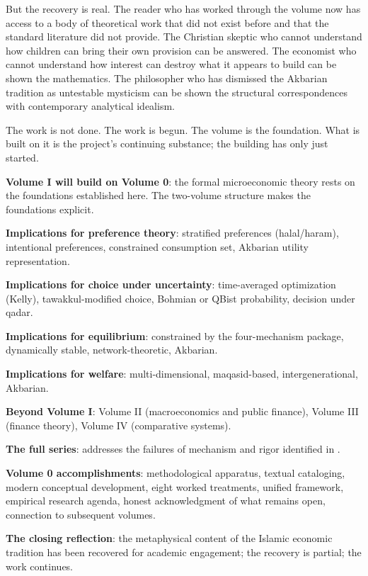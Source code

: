 But the recovery is real. The reader who has worked through the
volume now has access to a body of theoretical work that did not
exist before and that the standard literature did not provide.
The Christian skeptic who cannot understand how children can bring
their own provision can be answered. The economist who cannot
understand how interest can destroy what it appears to build can
be shown the mathematics. The philosopher who has dismissed the
Akbarian tradition as untestable mysticism can be shown the
structural correspondences with contemporary analytical idealism.

The work is not done. The work is begun. The volume is the
foundation. What is built on it is the project's continuing
substance; the building has only just started.

\begin{summarybox}
\textbf{Volume I will build on Volume 0}: the formal microeconomic
theory rests on the foundations established here. The two-volume
structure makes the foundations explicit.

\textbf{Implications for preference theory}: stratified
preferences (halal/haram), intentional preferences,
constrained consumption set, Akbarian utility representation.

\textbf{Implications for choice under uncertainty}: time-averaged
optimization (Kelly), tawakkul-modified choice, Bohmian or QBist
probability, decision under qadar.

\textbf{Implications for equilibrium}: constrained by the
four-mechanism package, dynamically stable, network-theoretic,
Akbarian.

\textbf{Implications for welfare}: multi-dimensional, maqasid-based,
intergenerational, Akbarian.

\textbf{Beyond Volume I}: Volume II (macroeconomics and public
finance), Volume III (finance theory), Volume IV (comparative
systems).

\textbf{The full series}: addresses the failures of mechanism and
rigor identified in .

\textbf{Volume 0 accomplishments}: methodological apparatus,
textual cataloging, modern conceptual development, eight worked
treatments, unified framework, empirical research agenda, honest
acknowledgment of what remains open, connection to subsequent
volumes.

\textbf{The closing reflection}: the metaphysical content of the
Islamic economic tradition has been recovered for academic
engagement; the recovery is partial; the work continues.
\end{summarybox}

